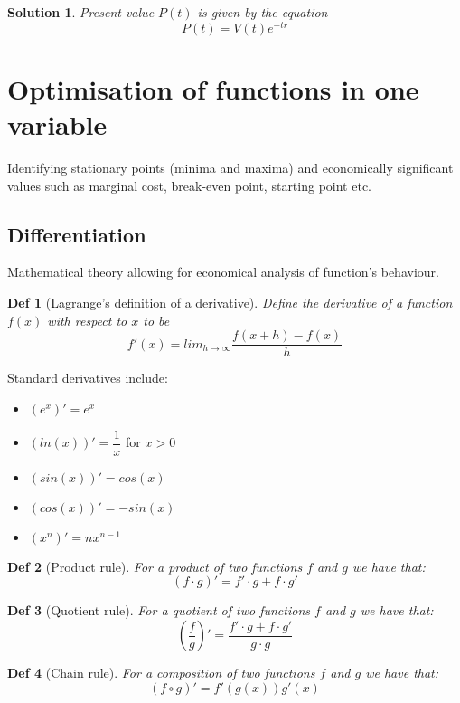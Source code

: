 \documentclass[11pt,a4paper, margin]{article}
\theoremstyle{break}
\theoremstyle{break}
\newtheorem*{solution}{Solution}
\newtheorem*{definition}{Def}
\begin{document}
\begin{solution}
Present value $P(t)$ is given by the equation \[ P(t) = V(t)e^{-tr} \]
\end{solution}

\section{Optimisation of functions in one variable}
Identifying stationary points (minima and maxima) and economically significant values such as marginal cost, break-even point, starting point etc.

\subsection{Differentiation}
Mathematical theory allowing for economical analysis of function's behaviour.

\begin{definition}[Lagrange's definition of a derivative]
Define the derivative of a function $f(x)$ with respect to $x$ to be 
\[f'(x) = lim_{h \rightarrow \infty} \dfrac{f(x+h) - f(x)}{h}\]
\end{definition}

Standard derivatives include:
\begin{itemize}
	\item $(e^x)'=e^x$
	\item $(ln(x))'=\dfrac{1}{x}$ for $x > 0$
	\item $(sin(x))'=cos(x)$
	\item $(cos(x))'=-sin(x)$
	\item $(x^n)'=nx^{n-1}$
\end{itemize}

\begin{definition}[Product rule]
For a product of two functions $f$ and $g$ we have that:
\[(f\cdot g)'=f'\cdot g + f\cdot g'\]
\end{definition}

\begin{definition}[Quotient rule]
For a quotient of two functions $f$ and $g$ we have that:
\[(\dfrac{f}{g})'=\dfrac{f'\cdot g + f\cdot g'}{g \cdot g}\]
\end{definition}

\begin{definition}[Chain rule]
For a composition of two functions $f$ and $g$ we have that:
\[(f \circ g)' = f'(g(x))g'(x)\]
\end{definition}
\end{document}
